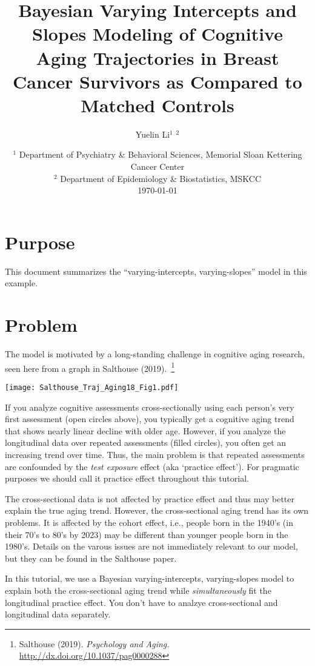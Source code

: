 \documentclass{article}
\title{Bayesian Varying Intercepts and Slopes Modeling of Cognitive Aging Trajectories in Breast Cancer Survivors as Compared to Matched Controls}
\author{Yuelin Li$^1$ $^2$}
\date{%
    $^1$ Department of Psychiatry \& Behavioral
Sciences, Memorial Sloan Kettering Cancer Center
    \\%
    $^2$
    Department of Epidemiology \& Biostatistics, MSKCC
    \\[2ex]%
    \today
}
\begin{document}
\maketitle

\section{Purpose}
This document summarizes the ``varying-intercepts, varying-slopes''
model in this example.
\section{Problem} The model is motivated by a long-standing challenge in cognitive 
aging research, seen here from a graph in Salthouse (2019).~\footnote{\scriptsize Salthouse (2019). \emph{Psychology and Aging.} \url{http://dx.doi.org/10.1037/pag0000288}}
  \begin{center}
  \texttt{[image: Salthouse\_Traj\_Aging18\_Fig1.pdf]}
  \end{center}
If you analyze cognitive assessments
cross-sectionally using each person's very first assessment (open
circles above), you typically get a cognitive aging trend
that shows nearly linear decline with older age.
However, if you analyze the longitudinal data over
repeated assessments (filled circles), you often get an
increasing trend over time.  Thus, the main problem is 
that repeated assessments are confounded by 
the \emph{test exposure} effect (aka
`practice effect').  For pragmatic purposes we should
call it practice effect throughout this tutorial. 

The cross-sectional data is not affected by practice
effect and thus may better explain the true aging trend.
However, the cross-sectional aging trend has its own
problems. It is affected by the cohort effect, i.e.,
people born in the 1940's (in their 70's to 80's by 2023)
may be different than younger people born in the 1980's.
Details on the varous issues are not immediately relevant
to our model, but they can be found in the Salthouse
paper.  

In this tutorial, we use a Bayesian varying-intercepts,
varying-slopes model to explain both the cross-sectional
aging trend while \emph{simultaneously} fit the
longitudinal practice effect. You don't have to analzye
cross-sectional and longitudinal data separately.
\end{document}
